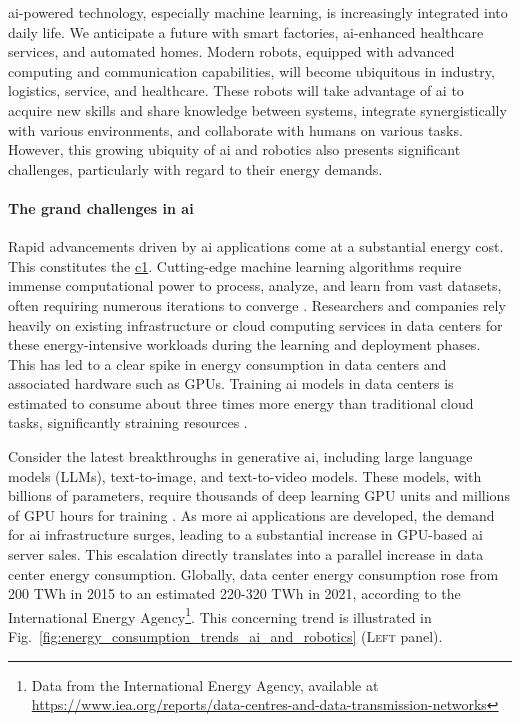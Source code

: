 \documentclass[12pt]{article}
\begin{document}
\Ac{ai}-powered technology, especially machine learning, is increasingly integrated into daily life. We anticipate a future with smart factories, \ac{ai}-enhanced healthcare services, and automated homes. Modern robots, equipped with advanced computing and communication capabilities, will become ubiquitous in industry, logistics, service, and healthcare. These robots will take advantage of \ac{ai} to acquire new skills and share knowledge between systems, integrate synergistically with various environments, and collaborate with humans on various tasks. However, this growing ubiquity of \ac{ai} and robotics also presents significant challenges, particularly with regard to their energy demands.

\paragraph*{The grand challenges in \ac{ai}}
Rapid advancements driven by \ac{ai} applications come at a substantial energy cost. This constitutes the \underline{\ac{c1}}. Cutting-edge machine learning algorithms require immense computational power to process, analyze, and learn from vast datasets, often requiring numerous iterations to converge \cite{Strubell2019EnergyPolicyConsiderations}. Researchers and companies rely heavily on existing infrastructure or cloud computing services in data centers for these energy-intensive workloads during the learning and deployment phases. This has led to a clear spike in energy consumption in data centers and associated hardware such as GPUs. Training \ac{ai} models in data centers is estimated to consume about three times more energy than traditional cloud tasks, significantly straining resources \cite{Thomas2023cloudusesmassive}.

Consider the latest breakthroughs in generative \ac{ai}, including large language models (LLMs), text-to-image, and text-to-video models. These models, with billions of parameters, require thousands of deep learning GPU units and millions of GPU hours for training \cite{Vanian2023ChatGPTgenerativeAI, Corbyn2023Nvidiachipmaker}. As more \ac{ai} applications are developed, the demand for \ac{ai} infrastructure surges, leading to a substantial increase in GPU-based \ac{ai} server sales. This escalation directly translates into a parallel increase in data center energy consumption. Globally, data center energy consumption rose from 200 TWh in 2015 to an estimated 220-320 TWh in 2021, according to the International Energy Agency\footnote{Data from the International Energy Agency, available at \url{https://www.iea.org/reports/data-centres-and-data-transmission-networks}}. This concerning trend is illustrated in Fig.~\ref{fig:energy_consumption_trends_ai_and_robotics} (\textsc{Left} panel).
\end{document}
